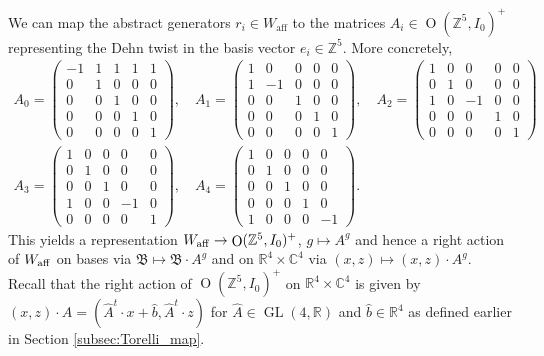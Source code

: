 \documentclass[12pt,letterpaper,reqno]{amsart}
\def\mathbf#1{#1}%
\theoremstyle{remark}
\theoremstyle{definition}
\numberwithin{thm}{section}
\numberwithin{equation}{section}
\numberwithin{figure}{section}
\newcommand{\R}{\ensuremath{\mathbb R}}
\newcommand{\C}{\ensuremath{\mathbb C}}
\newcommand{\Z}{\ensuremath{\mathbb Z}}
\DeclareMathOperator{\GL}{GL}
\DeclareMathOperator{\OO}{O}
\begin{document}
We can map the abstract generators $r_i \in W_{\mathrm{aff}}$ to the matrices  $A_i \in \OO(\Z^5,I_0)^+$ representing the Dehn twist in the basis vector $e_i \in \Z^5$. More concretely,
\[
\begin{gathered}
A_0 = \begin{pmatrix} -1 & 1 & 1 & 1 & 1 \\
 0 & 1 & 0 & 0 & 0 \\
 0 & 0& 1 & 0 & 0 \\
 0 & 0& 0 & 1 & 0 \\
 0 & 0& 0& 0&1 	
 \end{pmatrix}, \quad
 A_1 = \begin{pmatrix} 1 & 0 & 0 & 0 & 0 \\
 1 & -1 & 0 & 0 & 0 \\
 0 & 0& 1 & 0 & 0 \\
 0 & 0& 0 & 1 & 0 \\
 0 & 0& 0& 0&1 	
 \end{pmatrix}, \quad
 A_2 = \begin{pmatrix} 1 & 0 & 0 & 0 & 0 \\
 0 & 1 & 0 & 0 & 0 \\
 1 & 0& -1 & 0 & 0 \\
 0 & 0& 0 & 1 & 0 \\
 0 & 0& 0& 0&1 	
 \end{pmatrix}\\
 A_3 = \begin{pmatrix} 1 & 0 & 0 & 0 & 0 \\
 0 & 1 & 0 & 0 & 0 \\
 0 & 0& 1 & 0 & 0 \\
 1 & 0& 0 & -1 & 0 \\
 0 & 0& 0& 0&1 	
 \end{pmatrix}, \quad
 A_4 = \begin{pmatrix} 1 & 0 & 0 & 0 & 0 \\
 0 & 1 & 0 & 0 & 0 \\
 0 & 0& 1 & 0 & 0 \\
 0 & 0& 0 & 1 & 0 \\
 1 & 0& 0& 0& -1 	
 \end{pmatrix}.
\end{gathered}
\]
This yields a representation $W_{\rm{aff}} \to \OO(\Z^5,I_0)^+$, $g \mapsto A^g$ and hence a right action of $W_{\rm{aff}}$ on bases via $\mathfrak{B} \mapsto \mathfrak{B} \cdot A^g$ and on $\R^4 \times \C^4$ via $(\mathbf{x},\mathbf{z}) \mapsto (\mathbf{x},\mathbf{z}) \cdot A^g$. Recall that the right action of   $\OO(\Z^5,I_0)^+$ on $\R^4 \times \C^4$ is given by $(\mathbf{x},\mathbf{z}) \cdot A = (\hat{A}^t \cdot \mathbf{x} + \hat b, \hat{A}^t \cdot \mathbf{z})$ for $\hat{A} \in \GL(4,\R)$ and $\hat{b} \in \R^4$ as defined earlier in Section \ref{subsec:Torelli_map}.
\end{document}
